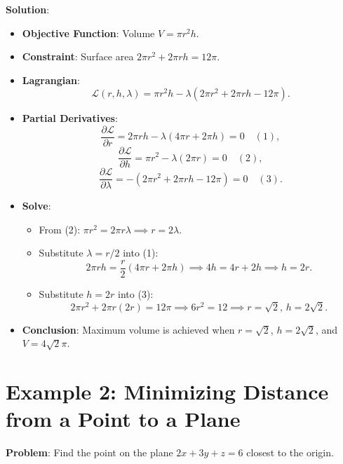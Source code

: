 \documentclass{article}
\begin{document}
\textbf{Solution}:
\begin{itemize}
    \item \textbf{Objective Function}: Volume $ V = \pi r^2 h $.
    \item \textbf{Constraint}: Surface area $ 2\pi r^2 + 2\pi rh = 12\pi $.
    \item \textbf{Lagrangian}:
    \[
    \mathcal{L}(r, h, \lambda) = \pi r^2 h - \lambda (2\pi r^2 + 2\pi rh - 12\pi).
    \]
    \item \textbf{Partial Derivatives}:
    \[
    \frac{\partial \mathcal{L}}{\partial r} = 2\pi r h - \lambda (4\pi r + 2\pi h) = 0 \quad (1),
    \]
    \[
    \frac{\partial \mathcal{L}}{\partial h} = \pi r^2 - \lambda (2\pi r) = 0 \quad (2),
    \]
    \[
    \frac{\partial \mathcal{L}}{\partial \lambda} = -(2\pi r^2 + 2\pi rh - 12\pi) = 0 \quad (3).
    \]
    \item \textbf{Solve}:
    \begin{itemize}
        \item From (2): $ \pi r^2 = 2\pi r \lambda \implies r = 2\lambda $.
        \item Substitute $ \lambda = r/2 $ into (1):
        \[
        2\pi r h = \frac{r}{2} (4\pi r + 2\pi h) \implies 4h = 4r + 2h \implies h = 2r.
        \]
        \item Substitute $ h = 2r $ into (3):
        \[
        2\pi r^2 + 2\pi r(2r) = 12\pi \implies 6r^2 = 12 \implies r = \sqrt{2}, \, h = 2\sqrt{2}.
        \]
    \end{itemize}
    \item \textbf{Conclusion}: Maximum volume is achieved when $ r = \sqrt{2} $, $ h = 2\sqrt{2} $, and $ V = 4\sqrt{2}\pi $.
\end{itemize}

\section*{Example 2: Minimizing Distance from a Point to a Plane}

\textbf{Problem}: Find the point on the plane $ 2x + 3y + z = 6 $ closest to the origin. \\
\end{document}
